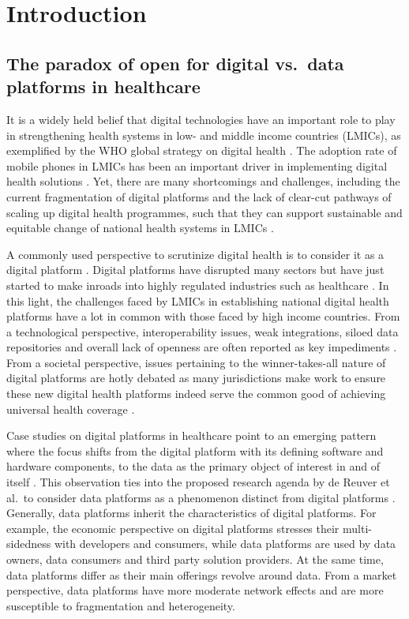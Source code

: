 \documentclass[
  authoryear]{elsarticle}
\begin{document}
\section{Introduction}\label{sec-intro}

\subsection{The paradox of open for digital vs.~data platforms in
healthcare}\label{the-paradox-of-open-for-digital-vs.-data-platforms-in-healthcare}

It is a widely held belief that digital technologies have an important
role to play in strengthening health systems in low- and middle income
countries (LMICs), as exemplified by the WHO global strategy on digital
health \citep{who2021global}. The adoption rate of mobile phones in
LMICs has been an important driver in implementing digital health
solutions \citep{mccool2022mobile}. Yet, there are many shortcomings and
challenges, including the current fragmentation of digital platforms and
the lack of clear-cut pathways of scaling up digital health programmes,
such that they can support sustainable and equitable change of national
health systems in LMICs
\citep{mccool2022mobile, who2019recommendations, neumark2021digital}.

A commonly used perspective to scrutinize digital health is to consider
it as a digital platform \citep{dereuver2018digital}. Digital platforms
have disrupted many sectors but have just started to make inroads into
highly regulated industries such as healthcare \citep{ozalp2022digital}.
In this light, the challenges faced by LMICs in establishing national
digital health platforms have a lot in common with those faced by high
income countries. From a technological perspective, interoperability
issues, weak integrations, siloed data repositories and overall lack of
openness are often reported as key impediments
\citep{malm-nicolais2023exploring, mehl2023fullstac}. From a societal
perspective, issues pertaining to the winner-takes-all nature of digital
platforms are hotly debated as many jurisdictions make work to ensure
these new digital health platforms indeed serve the common good of
achieving universal health coverage \citep{sharon2018when}.

Case studies on digital platforms in healthcare point to an emerging
pattern where the focus shifts from the digital platform with its
defining software and hardware components, to the data as the primary
object of interest in and of itself
\citep{ozalp2022digital, alaimo2022organizations}. This observation ties
into the proposed research agenda by de Reuver et al.~to consider data
platforms as a phenomenon distinct from digital platforms
\citep{dereuver2022openness}. Generally, data platforms inherit the
characteristics of digital platforms. For example, the economic
perspective on digital platforms stresses their multi-sidedness with
developers and consumers, while data platforms are used by data owners,
data consumers and third party solution providers. At the same time,
data platforms differ as their main offerings revolve around data. From
a market perspective, data platforms have more moderate network effects
and are more susceptible to fragmentation and heterogeneity.
\end{document}
